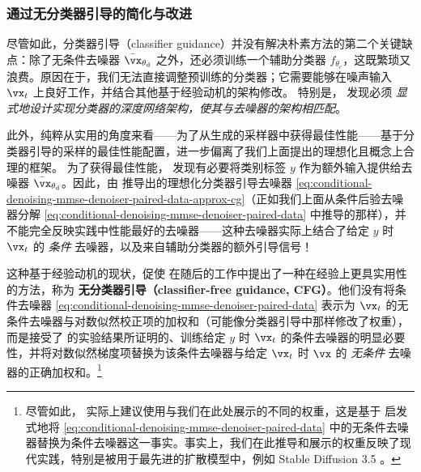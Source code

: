 \documentclass[../../book-main_zh.tex]{subfiles}
\begin{document}
\subsubsection{通过无分类器引导的简化与改进}

尽管如此，分类器引导（classifier guidance）并没有解决朴素方法的第二个关键缺点：除了无条件去噪器 $\bar{\vx}_{\theta_{\mathrm{d}}}$ 之外，还必须训练一个辅助分类器 $f_{\theta_{\mathrm{c}}}$，这既繁琐又浪费。原因在于，我们无法直接调整预训练的分类器；它需要能够在噪声输入 $\vx_t$ 上良好工作，并结合其他基于经验动机的架构修改。
特别是，\citet{Dhariwal2021-hg} 发现必须 \textit{显式地设计实现分类器的深度网络架构，使其与去噪器的架构相匹配}。

此外，纯粹从实用的角度来看——为了从生成的采样器中获得最佳性能——基于分类器引导的采样的最佳性能配置，进一步偏离了我们上面提出的理想化且概念上合理的框架。
为了获得最佳性能，\citet{Dhariwal2021-hg} 发现有必要将类别标签 $y$ 作为额外输入提供给去噪器 $\bar{\vx}_{\theta_{\mathrm{d}}}$。因此，由 \citet{Dhariwal2021-hg} 推导出的理想化分类器引导去噪器 \eqref{eq:conditional-denoising-mmse-denoiser-paired-data-approx-cg}（正如我们上面从条件后验去噪器分解 \eqref{eq:conditional-denoising-mmse-denoiser-paired-data} 中推导的那样），并不能完全反映实践中性能最好的去噪器——这种去噪器实际上结合了给定 $y$ 时 $\vx_t$ 的 \textit{条件} 去噪器，以及来自辅助分类器的额外引导信号！

这种基于经验动机的现状，促使 \citet{Ho2022-ry} 在随后的工作中提出了一种在经验上更具实用性的方法，称为 \textbf{无分类器引导（classifier-free guidance, CFG）}。他们没有将条件去噪器 \eqref{eq:conditional-denoising-mmse-denoiser-paired-data} 表示为 $\vx_t$ 的无条件去噪器与对数似然校正项的加权和（可能像分类器引导中那样修改了权重），而是接受了 \citet{Dhariwal2021-hg} 的实验结果所证明的、训练给定 $y$ 时 $\vx_t$ 的条件去噪器的明显必要性，并将对数似然梯度项替换为该条件去噪器与给定 $\vx_t$ 时 $\vx$ 的 \textit{无条件} 去噪器的正确加权和。\footnote{尽管如此，\textcite{Ho2022-ry} 实际上建议使用与我们在此处展示的不同的权重，这是基于 \textcite{Dhariwal2021-hg} 启发式地将 \eqref{eq:conditional-denoising-mmse-denoiser-paired-data} 中的无条件去噪器替换为条件去噪器这一事实。事实上，我们在此推导和展示的权重反映了现代实践，特别是被用于最先进的扩散模型中，例如 Stable Diffusion 3.5 \cite{DBLP:conf/icml/EsserKBEMSLLSBP24}。}
\end{document}
